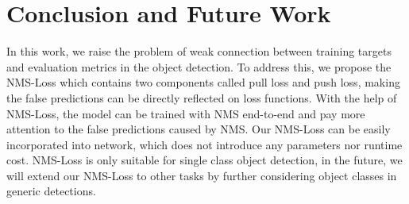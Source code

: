 \documentclass[sigconf]{acmart}
\begin{document}
\section{Conclusion and Future Work}
In this work, we raise the problem of weak connection between training targets and evaluation metrics in the object detection. To address this, we propose the NMS-Loss which contains two components called pull loss and push loss, making the false predictions can be directly reflected on loss functions. With the help of NMS-Loss, the model can be trained with NMS end-to-end and pay more attention to the false predictions caused by NMS. Our NMS-Loss can be easily incorporated into network, which does not introduce any parameters nor runtime cost. NMS-Loss is only suitable for single class object detection, in the future, we will extend our NMS-Loss to other tasks by further considering object classes in generic detections.

\balance
\end{document}
